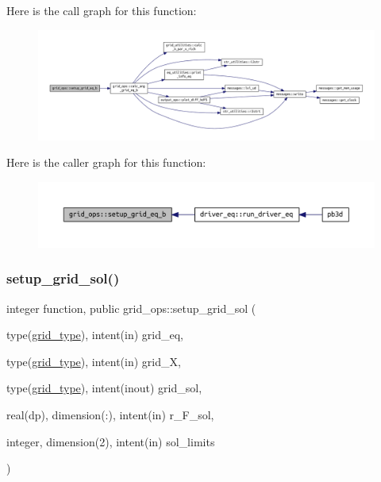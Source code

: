 Here is the call graph for this function\+:\nopagebreak
\begin{figure}[H]
\begin{center}
\leavevmode
\includegraphics[width=350pt]{namespacegrid__ops_ad16495ddd320562451c2325bafecf2d8_cgraph}
\end{center}
\end{figure}
Here is the caller graph for this function\+:\nopagebreak
\begin{figure}[H]
\begin{center}
\leavevmode
\includegraphics[width=350pt]{namespacegrid__ops_ad16495ddd320562451c2325bafecf2d8_icgraph}
\end{center}
\end{figure}
\mbox{\label{namespacegrid__ops_aeff1569cb9a043b03ed49250524fbd95}} 
\subsubsection{\texorpdfstring{setup\+\_\+grid\+\_\+sol()}{setup\_grid\_sol()}}
{\footnotesize\ttfamily integer function, public grid\+\_\+ops\+::setup\+\_\+grid\+\_\+sol (\begin{DoxyParamCaption}\item[{type(\hyperlink{structgrid__vars_1_1grid__type}{grid\+\_\+type}), intent(in)}]{grid\+\_\+eq,  }\item[{type(\hyperlink{structgrid__vars_1_1grid__type}{grid\+\_\+type}), intent(in)}]{grid\+\_\+X,  }\item[{type(\hyperlink{structgrid__vars_1_1grid__type}{grid\+\_\+type}), intent(inout)}]{grid\+\_\+sol,  }\item[{real(dp), dimension(\+:), intent(in)}]{r\+\_\+\+F\+\_\+sol,  }\item[{integer, dimension(2), intent(in)}]{sol\+\_\+limits }\end{DoxyParamCaption})}




